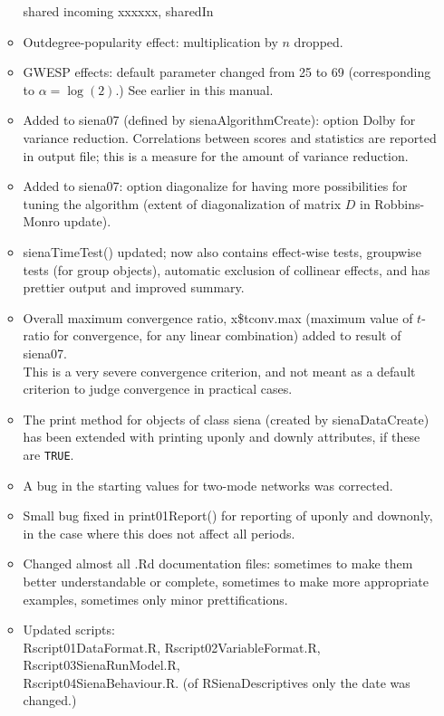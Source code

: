 \documentclass[a4paper,fleqn,11pt]{article}
\newcommand{\+}{\, + \,}
\newcommand{\sfn}[1]{\textsf{#1}}
\begin{document}
\begin{small}
\begin{itemize}
\begin{itemize}
		shared incoming xxxxxx, \sfn{sharedIn}
	\item Outdegree-popularity effect: multiplication by $n$ dropped.
	\item GWESP effects: default parameter changed from 25 to 69
		(corresponding to $\alpha = \log(2)$.) See earlier in this manual.
	\item Added to \sfn{siena07} (defined by \sfn{sienaAlgorithmCreate}):
		option \sfn{Dolby} for variance reduction.
		Correlations between scores and statistics are reported in output file;
		this is a measure for the amount of variance reduction.
	\item Added to \sfn{siena07}:
		option \sfn{diagonalize} for having more possibilities for
		tuning the algorithm
		(extent of diagonalization of matrix $D$ in Robbins-Monro update).
	\item \sfn{sienaTimeTest()} updated; now also contains effect-wise tests,
		groupwise tests (for group objects), automatic exclusion of
		collinear effects, and has prettier output and improved	summary.
	\item Overall maximum convergence ratio, \sfn{x\$tconv.max}
		(maximum value of $t$-ratio for convergence, for any linear combination)
		added to result of \sfn{siena07}.\\
        This is a very severe convergence criterion, and not meant as a default
        criterion to judge convergence in practical cases.
	\item The \sfn{print} method for objects of class \sfn{siena} (created by
        \sfn{sienaDataCreate})
		has been extended with printing \sfn{uponly} and \sfn{downly} attributes,
		if these are \texttt{TRUE}.
	\item A bug in the starting values for two-mode networks was corrected.
	\item Small bug fixed in \sfn{print01Report()} for reporting of \sfn{uponly}
        and \sfn{downonly},
		in the case where this does not affect all periods.
	\item Changed almost all \sfn{.Rd} documentation files: sometimes to make them
		better understandable or complete, sometimes to make more appropriate
		examples, sometimes only minor prettifications.
	\item Updated scripts:\\
		Rscript01DataFormat.R, Rscript02VariableFormat.R,
 	 	Rscript03SienaRunModel.R,\\
 	 	Rscript04SienaBehaviour.R.
		(of RSienaDescriptives only the date was changed.)
  \end{itemize}


\end{itemize}
\end{small}
\end{document}
